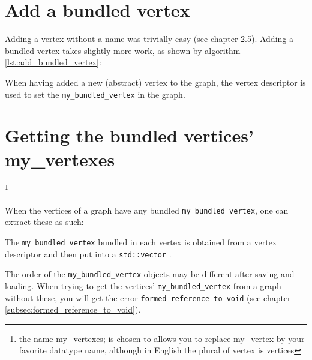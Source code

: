 \section{Add a bundled vertex}
\label{subsec:add_bundled_vertex}

Adding a vertex without a name was trivially easy (see chapter 2.5). 
Adding a bundled vertex takes slightly more work, 
as shown by algorithm \ref{lst:add_bundled_vertex}:



When having added a new (abstract) vertex to the graph, the vertex descriptor
is used to set the \verb;my_bundled_vertex; in the graph.

\section{Getting the bundled vertices' my\_vertexes}
\footnote{
  the name my\_vertexes; is chosen to allows you to
  replace my\_vertex by your favorite datatype name,
  although in English the plural of vertex is vertices
}
\label{subsec:get_bundled_vertex_my_vertexes}

When the vertices of a graph have any bundled \verb;my_bundled_vertex;, one can
extract these as such:



The \verb;my_bundled_vertex; bundled in each vertex is obtained from a vertex
descriptor and then put into a \verb;std::vector; .

The order of the \verb;my_bundled_vertex; objects may be different after saving
and loading.
When trying to get the vertices' \verb;my_bundled_vertex; from a graph without these, 
you will get the error 
\verb;formed reference to void; (see chapter \ref{subsec:formed_reference_to_void}).

